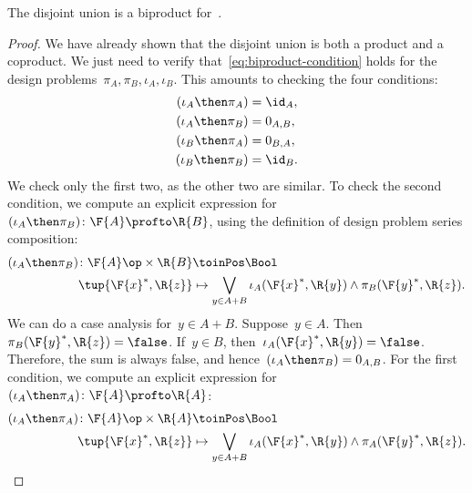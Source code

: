 \begin{lemma}
    The disjoint union is a biproduct for~\DP.
\end{lemma}
\begin{proof}
    We have already shown that the disjoint union is both a product and a coproduct.
    We just need to verify that~\cref{eq:biproduct-condition} holds for the design problems~$\pi_A, \pi_B, \iota_A, \iota_B$.
    This amounts to checking the four conditions:
    \begin{equation}
        \begin{aligned}
            (\iota_A\then \pi_A)
                                 & = \id_{A}, \\
            (\iota_A\then \pi_B) & = 0_{A,B}, \\
            (\iota_B\then \pi_A) & = 0_{B,A}, \\
            (\iota_B\then \pi_B) & = \id_{B}.
        \end{aligned}
    \end{equation}
    We check only the first two, as the other two are similar.
    To check the second condition, we compute an explicit expression for~$(\iota_A\then \pi_B)\colon \F{A} \profto \R{B}$, using the definition of design problem series composition:
    \begin{equation}
        \begin{aligned}
            (\iota_A\then \pi_B)
            \colon  \F{A}\op\times \R{B} & \toinPos \Bool \\
            \tup{\F{x}^*, \R{z}}         & \mapsto
            \bigvee_{y \in A + B} \iota_A(\F{x}^*,\R{y}) \wedge \pi_B(\F{y}^*,\R{z}).
        \end{aligned}
    \end{equation}
    We can do a case analysis for~$y\in A+B$.
    Suppose~$y\in A$.
    Then~$\pi_B(\F{y}^*,\R{z}) = \false$.
    If~$y \in B$, then~$\iota_A(\F{x}^*,\R{y}) = \false$.
    Therefore, the sum is always false, and hence~$(\iota_A\then \pi_B) = 0_{A,B}$.
    For the first condition, we compute an explicit expression for~$(\iota_A\then \pi_A) \colon \F{A} \profto \R{A}$:
    \begin{equation}
        \begin{aligned}
            (\iota_A\then \pi_A)
            \colon  \F{A}\op\times \R{A} & \toinPos \Bool \\
            \tup{\F{x}^*, \R{z}}         & \mapsto
            \bigvee_{y \in A + B} \iota_A(\F{x}^*,\R{y}) \wedge \pi_A(\F{y}^*,\R{z}).
        \end{aligned}

\end{equation}
\end{proof}
